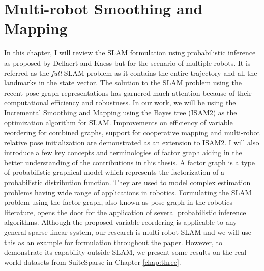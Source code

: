 \chapter{Multi-robot Smoothing and Mapping}
\label{chap:two}


In this chapter, I will review the SLAM formulation using probabilistic inference as proposed by Dellaert and Kaess \cite{dellaertsam} but for the scenario of multiple robots. It is referred as the \textit{full} SLAM problem as it contains the entire trajectory and all the landmarks in the state vector. The solution to the SLAM problem using the recent pose graph representations has garnered much attention because of their computational efficiency and robustness. In our work, we will be using the Incremental Smoothing and Mapping using the Bayes tree (ISAM2) \cite{kaessisam2} as the optimization algorithm for SLAM. Improvements on efficiency of variable reordering for combined graphs, support for cooperative mapping and multi-robot relative pose initialization are demonstrated as an extension to ISAM2. I will also introduce a few key concepts and terminologies of factor graph \cite{factorgraph} aiding in the better understanding of the contributions in this thesis. A factor graph is a type of probabilistic graphical model which represents the factorization of a probabilistic distribution function. They are used to model complex estimation problems having wide range of applications in robotics. Formulating the SLAM problem using the factor graph, also known as pose graph in the robotics literature, opens the door for the application of several probabilistic inference algorithms. Although the proposed variable reordering is applicable to any general sparse linear system, our research is multi-robot SLAM and we will use this as an example for formulation throughout the paper. However, to demonstrate its capability outside SLAM, we present some results on the real-world datasets from SuiteSparse \cite{suitesparse} in Chapter \ref{chap:three}.
